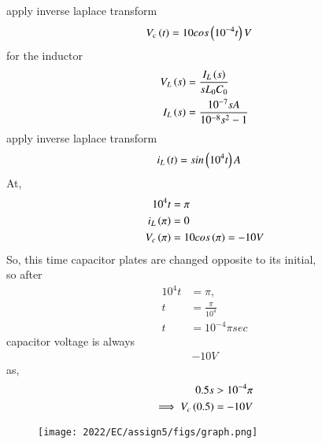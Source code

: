 \documentclass[journal,12pt,twocolumn]{IEEEtran}
\theoremstyle{remark}
\begin{document}
apply inverse laplace transform
\begin{align}
    V_c\left(t\right)&=10cos\left(10^{-4}t\right)V
\end{align} 
for the inductor
\begin{align}
    V_{L}\left(s\right)&=\frac{I_L\left(s\right)}{sL_{0}C_{0}}\\ 
    I_L\left(s\right)&=\frac{10^{-7}sA}{10^{-8}s^2-1}
\end{align}
apply inverse laplace transform
\begin{align}
    i_L\left(t\right)&=sin\left(10^4t\right)A
    \end{align}
    At,
    \begin{align}
    10^4t&=\pi\\
    i_L\left(\pi\right)&=0\\
    V_{c}\left(\pi\right)&=10cos\left(\pi\right)=-10V
\end{align}
So, this time capacitor plates are changed opposite to its initial,\\
so after \begin{align}
10^4t&=\pi,\\
t&=\frac{\pi}{10^4}\\
t&=10^{-4}\pi sec 
\end{align}
 capacitor voltage is always
\begin{align}
    -10V
\end{align}
as,
\begin{align}
0.5s&>10^{-4}\pi\\
\implies V_{c}\left(0.5\right)&=-10V
\end{align}
\begin{figure}[th]
\centering
\texttt{[image: 2022/EC/assign5/figs/graph.png]}
\end{figure}
\end{document}
